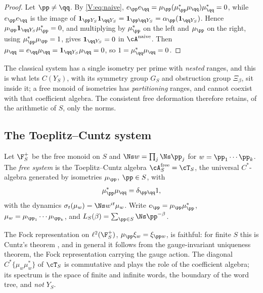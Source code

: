 \begin{proof}
Let $\pp\ne\qq$. By \eqref{V:eq:naive}, $e_\pp e_\qq=\mu_\pp(\mu_\pp^*\mu_\qq)\mu_\qq^*=0$,
while $e_\pp e_\qq$ is the image of $\mathbf 1_{\pp Y_S}\mathbf 1_{\qq Y_S}=\mathbf 1_{\pp\qq Y_S}=\alpha_\pp(\mathbf 1_{\qq Y_S})$.
Hence $\mu_\pp\mathbf 1_{\qq Y_S}\mu_\pp^*=0$, and multiplying by $\mu_\pp^*$ on the left and
$\mu_\pp$ on the right, using $\mu_\pp^*\mu_\pp=1$, gives $\mathbf 1_{\qq Y_S}=0$ in
$\cA^{\mathrm{naive}}$. Then $\mu_\qq=e_\qq\mu_\qq=\mathbf 1_{\qq Y_S}\mu_\qq=0$, so
$1=\mu_\qq^*\mu_\qq=0$.
\end{proof}

The classical system has a single isometry per prime with \emph{nested} ranges, and this
is what lets $C(Y_S)$, with its symmetry group $G_S$ and obstruction group $\Xi_\beta$, sit
inside it; a free monoid of isometries has \emph{partitioning} ranges, and cannot coexist
with that coefficient algebra. The consistent free deformation therefore retains, of the
arithmetic of $S$, only the norms.

\subsection{The Toeplitz--Cuntz system}

\begin{definition}\label{V:def:free}
Let $\F_S^+$ be the free monoid on $S$ and $\Ns w=\prod_j\Ns\pp_j$ for
$w=\pp_1\cdots\pp_k$. The \emph{free system} is the Toeplitz--Cuntz algebra
$\cA^{\mathrm{free}}_S=\cT_S$, the universal $C^*$-algebra generated by isometries $\mu_\pp$,
$\pp\in S$, with
\begin{equation}\label{V:eq:rel}
\mu_\pp^*\mu_\qq=\delta_{\pp\qq}1 ,
\end{equation}
with the dynamics $\sigma_t(\mu_w)=\Ns w^{it}\mu_w$. Write $e_\pp=\mu_\pp\mu_\pp^*$,
$\mu_w=\mu_{\pp_1}\cdots\mu_{\pp_k}$, and $L_S(\beta)=\sum_{\pp\in S}\Ns\pp^{-\beta}$.
\end{definition}

The Fock representation on $\ell^2(\F_S^+)$, $\mu_\pp\xi_w=\xi_{\pp w}$, is faithful: for
finite $S$ this is Cuntz's theorem \cite{Cuntz77}, and in general it follows from the
gauge-invariant uniqueness theorem, the Fock representation carrying the gauge action. The diagonal $C^*\{\mu_w\mu_w^*\}$ of $\cT_S$ is commutative and plays the
role of the coefficient algebra; its spectrum is the space of finite and infinite words,
the boundary of the word tree, and \emph{not} $Y_S$.

